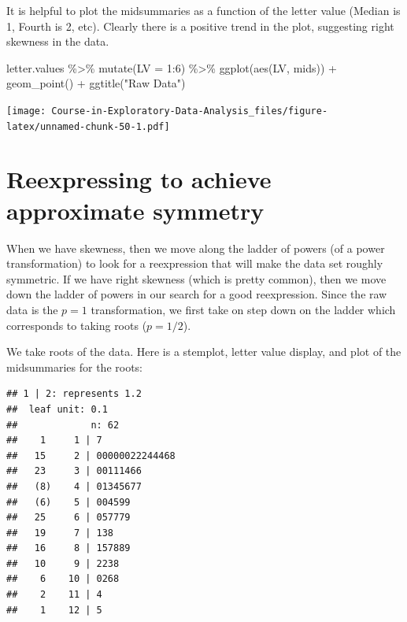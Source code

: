 \documentclass[
]{book}
\newenvironment{Shaded}{\begin{snugshade}}{\end{snugshade}}
\newcommand{\AttributeTok}[1]{\textcolor[rgb]{0.77,0.63,0.00}{#1}}
\newcommand{\DecValTok}[1]{\textcolor[rgb]{0.00,0.00,0.81}{#1}}
\newcommand{\FunctionTok}[1]{\textcolor[rgb]{0.00,0.00,0.00}{#1}}
\newcommand{\NormalTok}[1]{#1}
\newcommand{\OtherTok}[1]{\textcolor[rgb]{0.56,0.35,0.01}{#1}}
\newcommand{\SpecialCharTok}[1]{\textcolor[rgb]{0.00,0.00,0.00}{#1}}
\newcommand{\StringTok}[1]{\textcolor[rgb]{0.31,0.60,0.02}{#1}}
\begin{document}
It is helpful to plot the midsummaries as a function of the letter value (Median is 1, Fourth is 2, etc). Clearly there is a positive trend in the plot, suggesting right skewness in the data.

\begin{Shaded}
\begin{Highlighting}[]
\NormalTok{letter.values }\SpecialCharTok{\%\textgreater{}\%} \FunctionTok{mutate}\NormalTok{(}\AttributeTok{LV =} \DecValTok{1}\SpecialCharTok{:}\DecValTok{6}\NormalTok{) }\SpecialCharTok{\%\textgreater{}\%} 
  \FunctionTok{ggplot}\NormalTok{(}\FunctionTok{aes}\NormalTok{(LV, mids)) }\SpecialCharTok{+}
  \FunctionTok{geom\_point}\NormalTok{() }\SpecialCharTok{+} \FunctionTok{ggtitle}\NormalTok{(}\StringTok{"Raw Data"}\NormalTok{)}
\end{Highlighting}
\end{Shaded}

\texttt{[image: Course-in-Exploratory-Data-Analysis\_files/figure-latex/unnamed-chunk-50-1.pdf]}

\hypertarget{reexpressing-to-achieve-approximate-symmetry}{%
\section{Reexpressing to achieve approximate symmetry}\label{reexpressing-to-achieve-approximate-symmetry}}

When we have skewness, then we move along the ladder of powers (of a power transformation) to look for a reexpression that will make the data set roughly symmetric. If we have right skewness (which is pretty common), then we move down the ladder of powers in our search for a good reexpression. Since the raw data is the \(p = 1\) transformation, we first take on step down on the ladder which corresponds to taking roots (\(p = 1/2\)).

We take roots of the data. Here is a stemplot, letter value display, and plot of the midsummaries for the roots:

\begin{Shaded}
\end{Shaded}

\begin{verbatim}
## 1 | 2: represents 1.2
##  leaf unit: 0.1
##             n: 62
##    1     1 | 7
##   15     2 | 00000022244468
##   23     3 | 00111466
##   (8)    4 | 01345677
##   (6)    5 | 004599
##   25     6 | 057779
##   19     7 | 138
##   16     8 | 157889
##   10     9 | 2238
##    6    10 | 0268
##    2    11 | 4
##    1    12 | 5
\end{verbatim}
\end{document}
